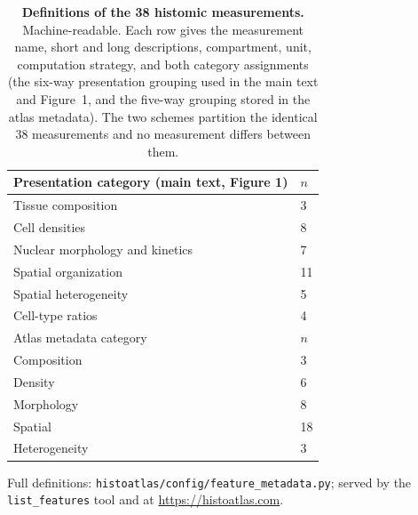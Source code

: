 \documentclass[11pt]{article}
\begin{document}
\begin{table}[htbp]
\centering
\caption{\textbf{Definitions of the 38 histomic measurements.} Machine-readable.
Each row gives the measurement name, short and long descriptions, compartment,
unit, computation strategy, and both category assignments (the six-way
presentation grouping used in the main text and Figure~1, and the five-way
grouping stored in the atlas metadata). The two schemes partition the identical
38 measurements and no measurement differs between them.}
\label{tab:s3}
\small
\begin{tabular}{ll}
\toprule
Presentation category (main text, Figure 1) & $n$ \\
\midrule
Tissue composition & 3 \\
Cell densities & 8 \\
Nuclear morphology and kinetics & 7 \\
Spatial organization & 11 \\
Spatial heterogeneity & 5 \\
Cell-type ratios & 4 \\
\midrule
Atlas metadata category & $n$ \\
\midrule
Composition & 3 \\
Density & 6 \\
Morphology & 8 \\
Spatial & 18 \\
Heterogeneity & 3 \\
\bottomrule
\end{tabular}
\par\vspace{0.4em}
\parbox{0.92\textwidth}{\footnotesize Full definitions:
\texttt{histoatlas/config/feature\_metadata.py}; served by the
\texttt{list\_features} tool and at \url{https://histoatlas.com}.}
\end{table}

\begin{table}[htbp]
\centering
\caption{\textbf{Curated molecular target panel.} Machine-readable. The 133
curated genes assessed for both expression and copy number, drawn from OncoKB
and the COSMIC Cancer Gene Census, together with immune checkpoint targets and
epithelial--mesenchymal transition and stemness markers; the 50 MSigDB Hallmark
gene sets, all used in the per-cancer correlation analysis; and
the 6 CIBERSORT immune cell fraction scores.
File: \texttt{histoatlas/config/molecular\_targets.py}.}
\label{tab:s4}
\end{table}
\end{document}
